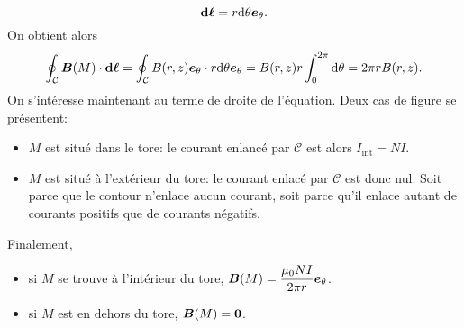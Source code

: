 \begin{equation*}
	\dl = r \dtheta \etheta.
\end{equation*}
On obtient alors
\begin{equation*}
	\oint_\mathcal{C} \vecb(M) \cdot \dl = 
	\oint_\mathcal{C} B(r,z) \etheta \cdot r \dtheta \etheta
	= B(r, z) r \int_0^{2 \pi} \dtheta
	= 2 \pi r B(r,z).
\end{equation*}
On s'intéresse maintenant au terme de droite de l'équation.
Deux cas de figure se présentent:
\begin{itemize}
	\item $M$ est situé dans le tore: le courant enlancé par $\mathcal{C}$ est alors
	  $I_\mathrm{int} = NI$.
       \item $M$ est situé à l'extérieur du tore: le courant enlacé par 
	       $\mathcal{C}$ est donc nul. Soit parce que le contour n'enlace 
	       aucun courant, soit parce qu'il enlace autant de courants positifs
	       que de courants négatifs.
\end{itemize}
Finalement,
\begin{framed}
\begin{itemize}
	\item si $M$ se trouve à l'intérieur du tore, 
	  $\vecb(M) = \dfrac{\mu_0 N I}{2 \pi r} \etheta$.
	\vspace{1em}
\item si $M$ est en dehors du tore, $\vecb(M) = \mitbf{0}$. 
\end{itemize}
\end{framed}


%
